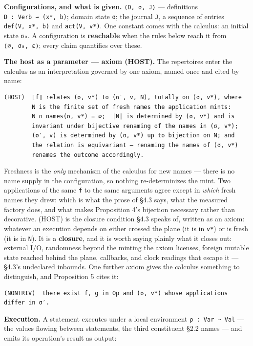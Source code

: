 \documentclass[
]{article}
\begin{document}
\textbf{Configurations, and what is given.} \texttt{⟨D,\ σ,\ J⟩} ---
definitions \texttt{D\ :\ Verb\ ⇀\ (x*,\ b)}; domain state \texttt{σ};
the journal \texttt{J}, a sequence of entries \texttt{def(V,\ x*,\ b)}
and \texttt{act(V,\ v*)}. One constant comes with the calculus: an
initial state \texttt{σ₀}. A configuration is \textbf{reachable} when
the rules below reach it from \texttt{⟨∅,\ σ₀,\ ε⟩}; every claim
quantifies over these.

\textbf{The host as a parameter --- axiom (HOST).} The repertoires enter
the calculus as an interpretation governed by one axiom, named once and
cited by name:

\begin{verbatim}
(HOST)  ⟦f⟧ relates (σ, v*) to (σ′, v, N), totally on (σ, v*), where
        N is the finite set of fresh names the application mints:
        N ∩ names(σ, v*) = ∅;  |N| is determined by (σ, v*) and is
        invariant under bijective renaming of the names in (σ, v*);
        (σ′, v) is determined by (σ, v*) up to bijection on N; and
        the relation is equivariant — renaming the names of (σ, v*)
        renames the outcome accordingly.
\end{verbatim}

Freshness is the \emph{only} mechanism of the calculus for new names ---
there is no name supply in the configuration, so nothing re-determinizes
the mint. Two applications of the same \texttt{f} to the same arguments
agree except in \emph{which} fresh names they drew: which is what the
prose of §4.3 says, what the measured factory does, and what makes
Proposition 4's bijection necessary rather than decorative. (HOST) is
the closure condition §4.3 speaks of, written as an axiom: whatever an
execution depends on either crossed the plane (it is in \texttt{v*}) or
is fresh (it is in \texttt{N}). It is a \textbf{closure}, and it is
worth saying plainly what it closes out: external I/O, randomness beyond
the minting the axiom licenses, foreign mutable state reached behind the
plane, callbacks, and clock readings that escape it --- §4.3's
undeclared inbounds. One further axiom gives the calculus something to
distinguish, and Proposition 5 cites it:

\begin{verbatim}
(NONTRIV)  there exist f, g in Op and (σ, v*) whose applications differ in σ′.
\end{verbatim}

\textbf{Execution.} A statement executes under a local environment
\texttt{ρ\ :\ Var\ ⇀\ Val} --- the values flowing between statements,
the third constituent §2.2 names --- and emits its operation's result as
output:
\end{document}
